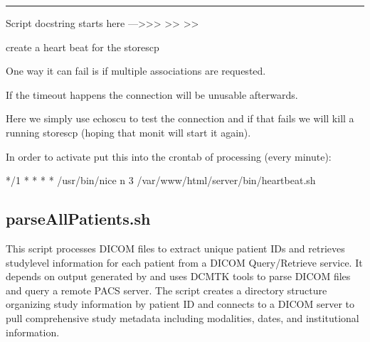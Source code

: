 \documentclass[letterpaper,10pt,english]{sphinxmanual}
\begin{document}
\bigskip\hrule\bigskip


\sphinxAtStartPar
Script docstring starts here —\textgreater{}\textgreater{}\textgreater{}
\textendash{}\textgreater{}\textgreater{}
\textendash{}\textgreater{}\textgreater{}

\sphinxAtStartPar
create a heart beat for the storescp

\sphinxAtStartPar
One way it can fail is if multiple associations are requested.

\sphinxAtStartPar
If the timeout happens the connection will be unusable afterwards.

\sphinxAtStartPar
Here we simply use echoscu to test the connection and if that fails we will kill a running storescp (hoping that monit will start it again).

\sphinxAtStartPar
In order to activate put this into the crontab of processing (every minute):

\begin{sphinxVerbatim}[commandchars=\\\{\}]
*/1 * * * * /usr/bin/nice \PYGZhy{}n 3 /var/www/html/server/bin/heartbeat.sh
\end{sphinxVerbatim}

\sphinxstepscope


\subsection{parseAllPatients.sh}
\label{\detokenize{Architecture/scripts/parseAllPatients:parseallpatients-sh}}\label{\detokenize{Architecture/scripts/parseAllPatients::doc}}
\sphinxAtStartPar
This script processes DICOM files to extract unique patient IDs and retrieves study\sphinxhyphen{}level information for each patient from a DICOM Query/Retrieve service. It depends on output generated by  and uses DCMTK tools to parse DICOM files and query a remote PACS server. The script creates a directory structure organizing study information by patient ID and connects to a DICOM server to pull comprehensive study metadata including modalities, dates, and institutional information.

\sphinxAtStartPar
{}


\sphinxAtStartPar
{}

\end{document}
